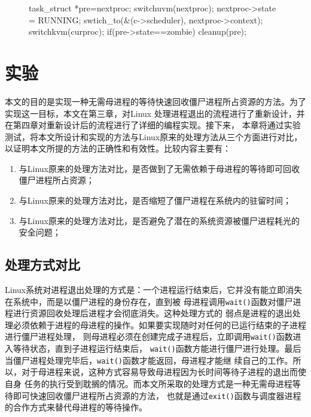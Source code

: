 \documentclass{swfuthesism}
\begin{document}
\begin{figure}
  \begin{codeblock}
\begin{ccode}
task_struct *pre=nextproc;
switchuvm(nextproc);
nextproc->state = RUNNING;
swtich_to(&(c->scheduler), nextproc->context);
switchkvm(curproc);
if(pre->state==zombie)
{  cleanup(pre);}
\end{ccode}
  \end{codeblock}
  \label{fig:lst:zombietestcode}
\end{figure}


\chapter{实验}

本文的目的是实现一种无需母进程的等待快速回收僵尸进程所占资源的方法。为了实现这一目标，本文在第三章，对Linux
处理进程退出的流程进行了重新设计，并在第四章对重新设计后的流程进行了详细的编程实现。接下来，
本章将通过实验测试，将本文所设计和实现的方法与Linux原来的处理方法从三个方面进行对比，
以证明本文所提的方法的正确性和有效性。比较内容主要有：
\begin{enumerate}
\item 与Linux原来的处理方法对比，是否做到了无需依赖于母进程的等待即可回收僵尸进程所占资源；
\item 与Linux原来的处理方法对比，是否缩短了僵尸进程在系统内的驻留时间；
\item 与Linux原来的处理方法对比，是否避免了潜在的系统资源被僵尸进程耗光的安全问题；
\end{enumerate}


\section{处理方式对比}

Linux系统对进程退出处理的方式是：一个进程运行结束后，它并没有能立即消失在系统中，而是以僵尸进程的身份存在，直到被
母进程调用\texttt{wait()}函数对僵尸进程进行资源回收处理后进程才会彻底消失。这种处理方式的
弱点是进程的退出处
理必须依赖于进程的母进程的操作。如果要实现随时对任何的已运行结束的子进程进行僵尸进程处理，
则母进程必须在创建完成子进程后，立即调用\texttt{wait()}函数进入等待状态，直到子进程运行结束后，
\texttt{wait()}函数方能进行僵尸进行处理。最后当僵尸进程处理完毕后，\texttt{wait()}函数才能返回，母进程才能继
续自己的工作。所以，对于母进程来说，这种方式容易导致母进程因为长时间等待子进程的退出而使自身
任务的执行受到耽搁的情况。而本文所采取的处理方式是一种无需母进程等待即可快速回收僵尸进程所占资源的方法，
也就是通过\texttt{exit()}函数与调度器进程的合作方式来替代母进程的等待操作。
\end{document}
